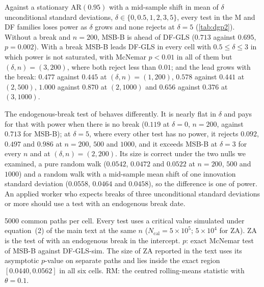 \documentclass[11pt]{article}
\newcommand{\ncal}{N_{\mathrm{cal}}}
\newcommand{\RMGLS}{MSB-B}
\begin{document}
Against a stationary AR$(0.95)$ with a mid-sample shift in mean of $\delta$
unconditional standard deviations, $\delta \in \{0, 0.5, 1, 2, 3, 5\}$,
every test in the M and DF families loses power as $\delta$ grows and none
rejects at $\delta = 5$ (\cref{tab:dgp2}). Without a break and $n = 200$,
\RMGLS{} is ahead of DF-GLS ($0.713$ against $0.695$, $p = 0.002$). With a
break \RMGLS{} leads DF-GLS in every cell with $0.5 \leq \delta \leq 3$ in
which power is not saturated, with McNemar $p < 0.01$ in all of them but
$(\delta, n) = (3, 200)$, where both reject less than $0.01$; and the lead
grows with the break: $0.477$ against $0.445$ at $(\delta, n) = (1, 200)$,
$0.578$ against $0.441$ at $(2, 500)$, $1.000$ against $0.870$ at $(2,
1000)$ and $0.656$ against $0.376$ at $(3, 1000)$.

The endogenous-break test of \citet{zivot1992further} behaves differently. It
is nearly flat in $\delta$ and pays for that with power when there is no
break ($0.119$ at $\delta = 0$, $n = 200$, against $0.713$ for \RMGLS{}); at
$\delta = 5$, where every other test has no power, it rejects $0.092$,
$0.497$ and $0.986$ at $n = 200$, $500$ and $1000$, and it exceeds \RMGLS{} at
$\delta = 3$ for every $n$ and at $(\delta, n) = (2, 200)$. Its size is correct
under the two nulls we examined, a pure random walk ($0.0542$, $0.0472$ and
$0.0522$ at $n = 200$, $500$ and $1000$) and a random walk with a mid-sample
mean shift of one innovation standard deviation ($0.0558$, $0.0464$ and
$0.0458$), so the difference is one of power. An applied worker who expects
breaks of three unconditional standard deviations or more should use a test
with an endogenous break date.

\begin{table}[t]
\centering
\caption{Power under a stationary AR$(0.95)$ with a mid-sample mean
break of $\delta$ unconditional standard deviations, constant case, at
equalized size, $\alpha = 0.05$.}
\label{tab:dgp2}
\resizebox{\textwidth}{!}{%
}
\par\medskip
\begin{minipage}{\textwidth}\footnotesize
5000 common paths per cell. Every test uses a critical value simulated
under equation~(2) of the main text at the same $n$ ($\ncal = 5\times10^5$; $5\times10^4$
for ZA). ZA is the test of \citet{zivot1992further} with an
endogenous break in the intercept. $p$: exact McNemar test of \RMGLS{}
against DF-GLS-sim. The size of ZA reported in the text uses its asymptotic
$p$-value on separate paths and lies inside the exact region
$[0.0440, 0.0562]$ in all six cells. RM: the centred rolling-means statistic with $\theta = 0.1$.
\end{minipage}
\end{table}
\end{document}
